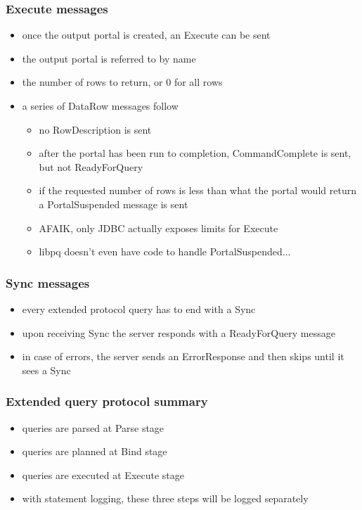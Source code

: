 \documentclass{beamer}
\begin{document}
\begin{frame}
  \frametitle{Execute messages}

  \begin{itemize}
  \item once the output portal is created, an Execute can be sent
  \item the output portal is referred to by name
  \item the number of rows to return, or 0 for all rows
  \item a series of DataRow messages follow
    \begin{itemize}
    \item no RowDescription is sent
    \item after the portal has been run to completion, CommandComplete is sent,
      but not ReadyForQuery
    \item if the requested number of rows is less than what the portal would
      return a PortalSuspended message is sent
    \item AFAIK, only JDBC actually exposes limits for Execute
    \item libpq doesn't even have code to handle PortalSuspended...
    \end{itemize}
  \end{itemize}

\end{frame}

\begin{frame}
  \frametitle{Sync messages}

  \begin{itemize}
  \item every extended protocol query has to end with a Sync
  \item upon receiving Sync the server responds with a ReadyForQuery message
  \item in case of errors, the server sends an ErrorResponse and then skips
    until it sees a Sync
  \end{itemize}
\end{frame}

\begin{frame}
  \frametitle{Extended query protocol summary}

  \begin{itemize}
  \item queries are parsed at Parse stage
  \item queries are planned at Bind stage
  \item queries are executed at Execute stage
  \item with statement logging, these three steps will be logged separately
  \end{itemize}
\end{frame}
\end{document}
